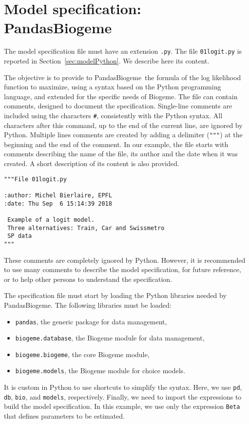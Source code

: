 \documentclass[12pt,a4paper]{article}
\newcommand{\PDBIOGEME}{PandasBiogeme}
\newcommand{\BIOGEME}{Biogeme}
\begin{document}
\section{Model specification: \PDBIOGEME}
\label{sec:mod}

The model specification file must have an extension \lstinline$.py$. 
The file \lstinline$01logit.py$ is reported in
Section~\ref{sec:modelPython}. We describe here its content. 

The objective is to provide to \PDBIOGEME\ the formula of the log
likelihood function to maximize, using a syntax based on the Python
programming language, and extended for the specific needs of \BIOGEME.
The file can
contain comments, designed to document the specification.
Single-line comments are included using the characters \verb+#+, consistently with
the Python syntax. All characters
after this command, up to the end of the current line, are ignored by
Python.
Multiple lines comments  are created by adding a delimiter
(\verb+"""+) at the beginning and the end  of the comment.
In our example, the file starts with comments describing the name of
the file, its author and the date when it was created. A short
description of its content is also provided. 
\begin{lstlisting}[style=nonumbers]
"""File 01logit.py

:author: Michel Bierlaire, EPFL
:date: Thu Sep  6 15:14:39 2018

 Example of a logit model.
 Three alternatives: Train, Car and Swissmetro
 SP data
"""
\end{lstlisting}
These comments are
completely ignored by Python. However, it is recommended to use
many comments to describe the model specification, for future
reference, or to help other persons to understand the specification. 

The specification file must start by loading the Python libraries
needed by \PDBIOGEME. The following libraries must be loaded:
\begin{itemize}
\item \lstinline+pandas+, the generic package for data management,
\item \lstinline+biogeme.database+, the Biogeme module for data management,
\item \lstinline+biogeme.biogeme+, the core Biogeme module,
\item \lstinline+biogeme.models+, the Biogeme module for choice models.
\end{itemize}
It is custom in Python to use shortcuts to simplify the syntax. Here,
we use \lstinline+pd+,  \lstinline+db+,   \lstinline+bio+, and   \lstinline+models+,
respectively.   Finally, we need to import the expressions to build
the model specification. In this example, we use only the expression
\lstinline+Beta+ that defines parameters to be estimated.
 
\end{document}
